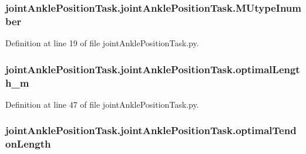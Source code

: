\subsubsection[{\texorpdfstring{M\+Utype\+Inumber}{MUtypeInumber}}]{\setlength{\rightskip}{0pt plus 5cm}joint\+Ankle\+Position\+Task.\+joint\+Ankle\+Position\+Task.\+M\+Utype\+Inumber}\hypertarget{classjoint_ankle_position_task_1_1joint_ankle_position_task_a242bf5621b3cf0cd557f985a7b13bbc2}{}\label{classjoint_ankle_position_task_1_1joint_ankle_position_task_a242bf5621b3cf0cd557f985a7b13bbc2}


Definition at line 19 of file joint\+Ankle\+Position\+Task.\+py.

\subsubsection[{\texorpdfstring{optimal\+Length\+\_\+m}{optimalLength_m}}]{\setlength{\rightskip}{0pt plus 5cm}joint\+Ankle\+Position\+Task.\+joint\+Ankle\+Position\+Task.\+optimal\+Length\+\_\+m}\hypertarget{classjoint_ankle_position_task_1_1joint_ankle_position_task_a5224131e715b5a046072019fe5a14366}{}\label{classjoint_ankle_position_task_1_1joint_ankle_position_task_a5224131e715b5a046072019fe5a14366}


Definition at line 47 of file joint\+Ankle\+Position\+Task.\+py.

\subsubsection[{\texorpdfstring{optimal\+Tendon\+Length}{optimalTendonLength}}]{\setlength{\rightskip}{0pt plus 5cm}joint\+Ankle\+Position\+Task.\+joint\+Ankle\+Position\+Task.\+optimal\+Tendon\+Length}\hypertarget{classjoint_ankle_position_task_1_1joint_ankle_position_task_a317520ad66ca71d53efa31f0ce985e2e}{}\label{classjoint_ankle_position_task_1_1joint_ankle_position_task_a317520ad66ca71d53efa31f0ce985e2e}


